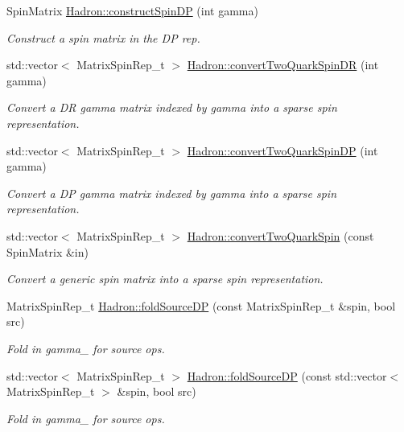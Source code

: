 \begin{DoxyCompactItemize}
Spin\+Matrix \mbox{\hyperlink{namespaceHadron_af2328410f9a0a7191a4d319284425fed}{Hadron\+::construct\+Spin\+DP}} (int gamma)
\begin{DoxyCompactList}\small\item\em Construct a spin matrix in the DP rep. \end{DoxyCompactList}\item 
std\+::vector$<$ Matrix\+Spin\+Rep\+\_\+t $>$ \mbox{\hyperlink{namespaceHadron_aadefc7d519d40f16cb37c4df644944e7}{Hadron\+::convert\+Two\+Quark\+Spin\+DR}} (int gamma)
\begin{DoxyCompactList}\small\item\em Convert a DR gamma matrix indexed by gamma into a sparse spin representation. \end{DoxyCompactList}\item 
std\+::vector$<$ Matrix\+Spin\+Rep\+\_\+t $>$ \mbox{\hyperlink{namespaceHadron_a9d2555db4b8f920142f7c79e6752eccd}{Hadron\+::convert\+Two\+Quark\+Spin\+DP}} (int gamma)
\begin{DoxyCompactList}\small\item\em Convert a DP gamma matrix indexed by gamma into a sparse spin representation. \end{DoxyCompactList}\item 
std\+::vector$<$ Matrix\+Spin\+Rep\+\_\+t $>$ \mbox{\hyperlink{namespaceHadron_a6bcb90f42724a0f4ce09eeb64bd54c80}{Hadron\+::convert\+Two\+Quark\+Spin}} (const Spin\+Matrix \&in)
\begin{DoxyCompactList}\small\item\em Convert a generic spin matrix into a sparse spin representation. \end{DoxyCompactList}\item 
Matrix\+Spin\+Rep\+\_\+t \mbox{\hyperlink{namespaceHadron_aa258f26ea52528eac314f32a02bf8ac3}{Hadron\+::fold\+Source\+DP}} (const Matrix\+Spin\+Rep\+\_\+t \&spin, bool src)
\begin{DoxyCompactList}\small\item\em Fold in gamma\+\_ for source ops. \end{DoxyCompactList}\item 
std\+::vector$<$ Matrix\+Spin\+Rep\+\_\+t $>$ \mbox{\hyperlink{namespaceHadron_a26162db6431302c5e52fbd5fafdbedae}{Hadron\+::fold\+Source\+DP}} (const std\+::vector$<$ Matrix\+Spin\+Rep\+\_\+t $>$ \&spin, bool src)
\begin{DoxyCompactList}\small\item\em Fold in gamma\+\_ for source ops. \end{DoxyCompactList}\item 

\end{DoxyCompactItemize}

